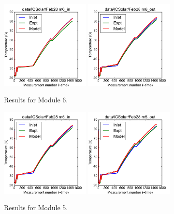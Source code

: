 \documentclass{article}
\begin{document}
\begin{figure}[!ht]
\centering
\includegraphics[width=0.4\textwidth]{../../data/ICSolar/images/Feb28_m6_in.pdf}\hspace{0.05\textwidth}
\includegraphics[width=0.4\textwidth]{../../data/ICSolar/images/Feb28_m6_out.pdf}\hspace{0.05\textwidth}\\
\caption{Results for Module 6.}\end{figure}
\begin{figure}[!ht]
\centering
\includegraphics[width=0.4\textwidth]{../../data/ICSolar/images/Feb28_m5_in.pdf}\hspace{0.05\textwidth}
\includegraphics[width=0.4\textwidth]{../../data/ICSolar/images/Feb28_m5_out.pdf}\hspace{0.05\textwidth}\\
\caption{Results for Module 5.}\end{figure}
\end{document}
